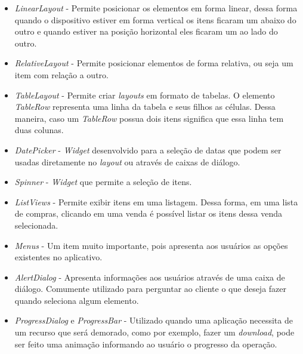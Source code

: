 	\begin{itemize}
	
	 \item \textit{LinearLayout} - Permite posicionar os elementos em forma
	 linear, dessa forma quando o dispositivo estiver em forma vertical os itens
	 ficaram um abaixo do outro e quando estiver na posição horizontal eles
	 ficaram um ao lado do outro.
	
	  \item \textit{RelativeLayout} - Permite posicionar elementos de forma
	  relativa, ou seja um item com relação a outro.
	
	  \item \textit{TableLayout} - Permite criar \textit{layouts} em formato de
	  tabelas. O elemento \textit{TableRow} representa uma linha da tabela e seus
	  filhos as células.  Dessa maneira, caso um \textit{TableRow} possua dois
	  itens significa que essa linha tem duas colunas.
	
	  \item \textit{DatePicker} - \textit{Widget} desenvolvido para a seleção de
	  datas que podem ser usadas diretamente no \textit{layout} ou através de
	  caixas de diálogo.

	  \item \textit{Spinner} - \textit{Widget} que permite a seleção de itens. 
	
	  \item \textit{ListViews} - Permite exibir itens em uma listagem. Dessa
	  forma, em uma lista de compras, clicando em uma venda é possível listar os
	  itens dessa venda selecionada.
	
	  \item \textit{Menus} - Um item muito importante, pois apresenta aos usuários
	  as opções existentes no aplicativo.
	
	  \item \textit{AlertDialog} - Apresenta informações aos usuários através de
	  uma caixa de diálogo. Comumente utilizado para perguntar ao cliente o que
	  deseja fazer quando seleciona algum elemento.
	
	  \item \textit{ProgressDialog} e \textit{ProgressBar} - Utilizado quando uma
	  aplicação necessita de um recurso que será demorado, como por exemplo, fazer
	  um \textit{download}, pode ser feito uma animação informando ao usuário o
	  progresso da operação.
	
	\end{itemize}
	
